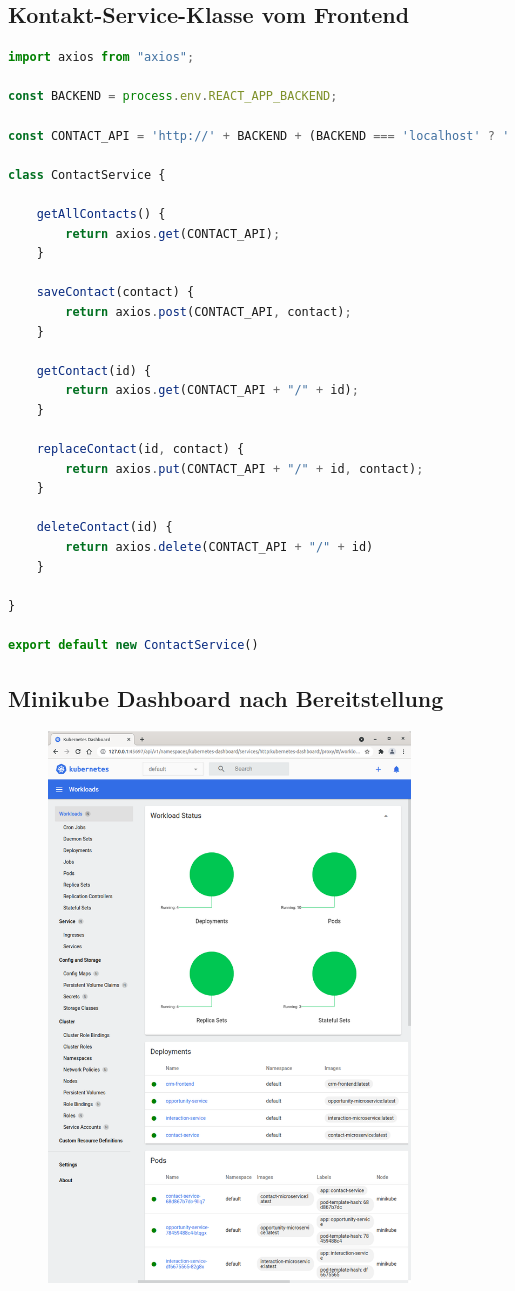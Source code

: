 \subsection*{Kontakt-Service-Klasse vom Frontend}
\begin{lstlisting}[language=JavaScript]
import axios from "axios";

const BACKEND = process.env.REACT_APP_BACKEND;

const CONTACT_API = 'http://' + BACKEND + (BACKEND === 'localhost' ? ':8080' : ':30010') + '/contacts';

class ContactService {

    getAllContacts() {
        return axios.get(CONTACT_API);
    }

    saveContact(contact) {
        return axios.post(CONTACT_API, contact);
    }

    getContact(id) {
        return axios.get(CONTACT_API + "/" + id);
    }

    replaceContact(id, contact) {
        return axios.put(CONTACT_API + "/" + id, contact);
    }

    deleteContact(id) {
        return axios.delete(CONTACT_API + "/" + id)
    }

}

export default new ContactService()
\end{lstlisting}

\clearpage
\subsection*{Minikube Dashboard nach Bereitstellung}

\begin{figure}[H] 
    \centering
    \includegraphics[width=0.855\textwidth]{figures/MinikubeDashboard.png}
\end{figure}